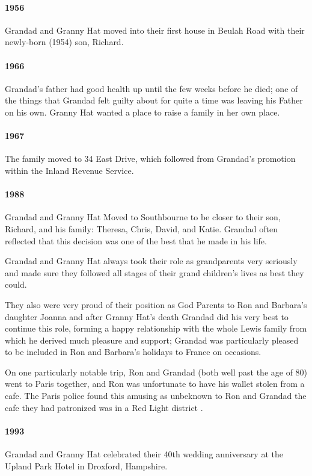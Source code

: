 \paragraph{1956} Grandad and Granny Hat moved into their first house in Beulah Road with their newly-born (1954) son, Richard.
\paragraph{1966} Grandad's father had good health up until the few weeks before he died; one
of the things that Grandad felt guilty about for quite a time was leaving his Father on his own. Granny Hat  wanted
a place to raise a family in her own place.
\paragraph{1967} The family moved to 34 East Drive, which followed from Grandad's promotion within
the Inland Revenue Service.
\paragraph{1988} Grandad and Granny Hat Moved to Southbourne to be closer to their son, Richard, and his family: Theresa, Chris, 
David, and Katie. Grandad often reflected that this decision was one of the best 
that he made in his life. 

Grandad and Granny Hat always took their role as grandparents very seriously and made sure they followed all
stages of their grand children's lives as best they could.

They also were very proud of their position as God
Parents to Ron and Barbara's daughter Joanna and after Granny Hat's death Grandad did his very best to
continue this role, forming a happy relationship with the whole Lewis family from which he derived much pleasure and support;
Grandad was particularly pleased to be included in Ron and Barbara's holidays to France on occasions.

On one particularly notable trip, Ron and Grandad (both well past the age of 80) went to Paris together, and Ron
was unfortunate to have his wallet stolen from a cafe. The Paris police found this amusing
as unbeknown to Ron and Grandad the cafe they had patronized was in a Red Light district .

\paragraph{1993} Grandad and Granny Hat celebrated their 40th wedding anniversary
at the Upland Park Hotel in Droxford, Hampshire.

